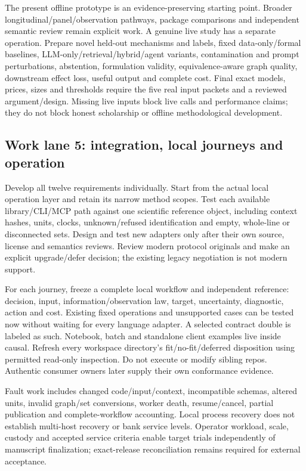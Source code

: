\documentclass[
  10pt,
]{article}
\begin{document}
The present offline prototype is an evidence-preserving starting point.
Broader longitudinal/panel/observation pathways, package comparisons and
independent semantic review remain explicit work. A genuine live study
has a separate operation. Prepare novel held-out mechanisms and labels,
fixed data-only/formal baselines, LLM-only/retrieval/hybrid/agent
variants, contamination and prompt perturbations, abstention,
formulation validity, equivalence-aware graph quality, downstream effect
loss, useful output and complete cost. Final exact models, prices, sizes
and thresholds require the five real input packets and a reviewed
argument/design. Missing live inputs block live calls and performance
claims; they do not block honest scholarship or offline methodological
development.

\hypertarget{work-lane-5-integration-local-journeys-and-operation}{%
\subsection{Work lane 5: integration, local journeys and
operation}\label{work-lane-5-integration-local-journeys-and-operation}}

Develop all twelve requirements individually. Start from the actual
local operation layer and retain its narrow method scopes. Test each
available library/CLI/MCP path against one scientific reference object,
including context hashes, units, clocks, unknown/refused identification
and empty, whole-line or disconnected sets. Design and test new adapters
only after their own source, license and semantics reviews. Review
modern protocol originals and make an explicit upgrade/defer decision;
the existing legacy negotiation is not modern support.

For each journey, freeze a complete local workflow and independent
reference: decision, input, information/observation law, target,
uncertainty, diagnostic, action and cost. Existing fixed operations and
unsupported cases can be tested now without waiting for every language
adapter. A selected contract double is labeled as such. Notebook, batch
and standalone client examples live inside causal. Refresh every
workspace directory's fit/no-fit/deferred disposition using permitted
read-only inspection. Do not execute or modify sibling repos. Authentic
consumer owners later supply their own conformance evidence.

Fault work includes changed code/input/context, incompatible schemas,
altered units, invalid graph/set conversions, worker death,
resume/cancel, partial publication and complete-workflow accounting.
Local process recovery does not establish multi-host recovery or bank
service levels. Operator workload, scale, custody and accepted service
criteria enable target trials independently of manuscript finalization;
exact-release reconciliation remains required for external acceptance.
\end{document}
